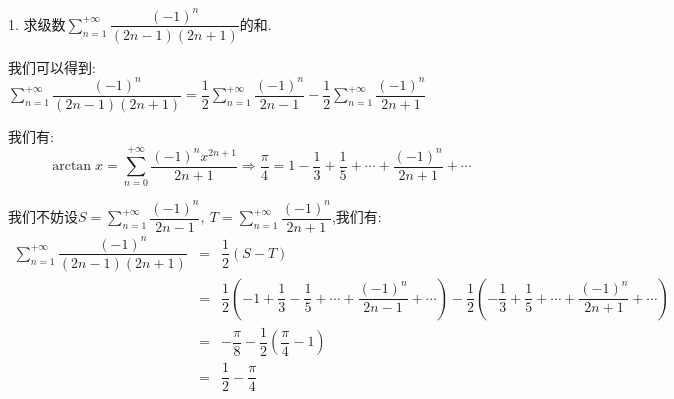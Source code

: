 1. 求级数$\sum\limits_{n=1}^{+\infty}\dfrac{(-1)^n}{(2n-1)(2n+1)}$的和.
\begin{solution}
	
	我们可以得到: $\sum\limits_{n=1}^{+\infty}\dfrac{(-1)^n}{(2n-1)(2n+1)}=\dfrac{1}{2}\sum\limits_{n=1}^{+\infty}\dfrac{(-1)^n}{2n-1}-\dfrac{1}{2}\sum\limits_{n=1}^{+\infty}\dfrac{(-1)^n}{2n+1}$
	
	我们有: 
	$$\arctan x=\sum\limits_{n=0}^{+\infty}\dfrac{(-1)^nx^{2n+1}}{2n+1}\Rightarrow \dfrac{\pi}{4}=1-\dfrac{1}{3}+\dfrac{1}{5}+\cdots+\dfrac{(-1)^n}{2n+1}+\cdots$$
	
	我们不妨设$S=\sum\limits_{n=1}^{+\infty}\dfrac{(-1)^n}{2n-1},\ T=\sum\limits_{n=1}^{+\infty}\dfrac{(-1)^n}{2n+1}$,我们有: 
	\begin{eqnarray*}
		\sum\limits_{n=1}^{+\infty}\dfrac{(-1)^n}{(2n-1)(2n+1)}&=&\dfrac{1}{2}(S-T)\\
		&=&\dfrac{1}{2}(-1+\dfrac{1}{3}-\dfrac{1}{5}+\cdots+\dfrac{(-1)^n}{2n-1}+\cdots)-\dfrac{1}{2}(-\dfrac{1}{3}+\dfrac{1}{5}+\cdots+\dfrac{(-1)^n}{2n+1}+\cdots)\\
		&=&-\dfrac{\pi}{8}-\dfrac{1}{2}(\dfrac{\pi}{4}-1)\\
		&=&\dfrac{1}{2}-\dfrac{\pi}{4}
	\end{eqnarray*}
	
\end{solution}
